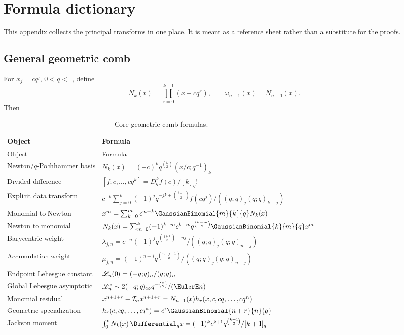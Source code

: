 \section{Formula dictionary}
\label{gq:app:formula-dictionary}

This appendix collects the principal transforms in one place.  It is meant
as a reference sheet rather than a substitute for the proofs.

\subsection{General geometric comb}

For $x_j=cq^j$, $0<q<1$, define
\[
 N_k(x)=\prod_{r=0}^{k-1}(x-cq^r),
 \qquad
 \omega_{n+1}(x)=N_{n+1}(x).
\]
Then
\begin{longtable}{@{}p{}p{}@{}}
\caption{Core geometric-comb formulas.}\label{gq:tab:formula-dictionary-general}\\
\toprule
Object & Formula\\
\midrule
\endfirsthead
\toprule
Object & Formula\\
\midrule
\endhead
Newton/$q$-Pochhammer basis
& $N_k(x)=(-c)^kq^{\binom k2}(x/c;q^{-1})_k$\\[4pt]
Divided difference
& $[f;c,\ldots,cq^k]=D_q^kf(c)/[k]_q!$\\[4pt]
Explicit data transform
& $c^{-k}\sum_{j=0}^k
 (-1)^jq^{-jk+\binom{j+1}{2}}f(cq^j)/
 ((q;q)_j(q;q)_{k-j})$\\[6pt]
Monomial to Newton
& $x^m=\sum_{k=0}^{m}c^{m-k}\GaussianBinomial{m}{k}{q}N_k(x)$\\[4pt]
Newton to monomial
& $N_k(x)=\sum_{m=0}^{k}(-1)^{k-m}c^{k-m}
 q^{\binom{k-m}{2}}\GaussianBinomial{k}{m}{q}x^m$\\[6pt]
Barycentric weight
& $\lambda_{j,n}=c^{-n}(-1)^jq^{\binom{j+1}{2}-nj}/
 ((q;q)_j(q;q)_{n-j})$\\[6pt]
Accumulation weight
& $\mu_{j,n}=(-1)^{n-j}q^{\binom{n-j+1}{2}}/
 ((q;q)_j(q;q)_{n-j})$\\[6pt]
Endpoint Lebesgue constant
& $\mathscr L_n(0)=(-q;q)_n/(q;q)_n$\\[4pt]
Global Lebesgue asymptotic
& $\Leb_n^*\sim2(-q;q)_\infty q^{-\binom n2}/(\EulerE n)$\\[4pt]
Monomial residual
& $x^{n+1+r}-\mathcal I_nx^{n+1+r}
 =N_{n+1}(x)h_r(x,c,cq,\ldots,cq^n)$\\[6pt]
Geometric specialization
& $h_r(c,cq,\ldots,cq^n)=c^r\GaussianBinomial{n+r}{n}{q}$\\[4pt]
Jackson moment
& $\int_0^cN_k(x)\,\Differential_qx=(-1)^kc^{k+1}
 q^{\binom{k+1}{2}}/[k+1]_q$\\
\bottomrule
\end{longtable}

